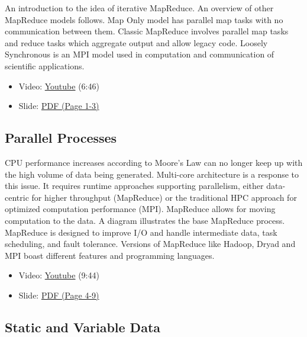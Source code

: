 An introduction to the idea of iterative MapReduce. An overview of other
MapReduce models follows. Map Only model has parallel map tasks with no
communication between them. Classic MapReduce involves parallel map
tasks and reduce tasks which aggregate output and allow legacy code.
Loosely Synchronous is an MPI model used in computation and
communication of scientific applications.

\begin{itemize}

\item
  Video: \href{https://www.youtube.com/watch?v=CXDdWmAWIvk}{Youtube}
  (6:46)
\item
  Slide:
  \href{https://drive.google.com/open?id=0B88HKpainTSfMFBaNHprbWJwQms}{PDF
  (Page 1-3)}
\end{itemize}

\subsection{Parallel Processes}\label{parallel-processes}

CPU performance increases according to Moore's Law can no longer keep up
with the high volume of data being generated. Multi-core architecture is
a response to this issue. It requires runtime approaches supporting
parallelism, either data-centric for higher throughput (MapReduce) or
the traditional HPC approach for optimized computation performance
(MPI). MapReduce allows for moving computation to the data. A diagram
illustrates the base MapReduce process. MapReduce is designed to improve
I/O and handle intermediate data, task scheduling, and fault tolerance.
Versions of MapReduce like Hadoop, Dryad and MPI boast different
features and programming languages.

\begin{itemize}

\item
  Video: \href{https://www.youtube.com/watch?v=JAYvkIZ8TuE}{Youtube}
  (9:44)
\item
  Slide:
  \href{https://drive.google.com/open?id=0B88HKpainTSfMFBaNHprbWJwQms}{PDF
  (Page 4-9)}
\end{itemize}

\subsection{Static and Variable Data}\label{static-and-variable-data}

